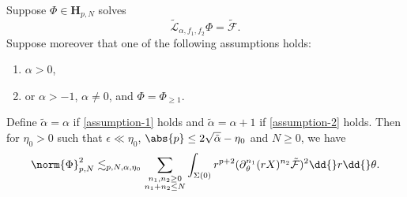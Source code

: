 \documentclass[10pt, reqno]{amsart}
\begin{document}
\begin{lemma}
Suppose \(\Phi{}\in \mathbf{H}_{p,N}\) solves
\begin{equation}\label{La-equation}
\tilde{\mathcal{L}}_{\alpha{},f_1,f_2}\Phi{} = \tilde{\mathcal{F}}.
\end{equation}
Suppose moreover that one of the following assumptions holds:
\begin{enumerate}
\item \label{assumption-1} \(\alpha{} > 0\),
\item \label{assumption-2} or \(\alpha{}>-1\), \(\alpha{}\neq{}0\), and \(\Phi{}=\Phi_{\ge 1}\).
\end{enumerate}
Define \(\tilde{\alpha{}} = \alpha{}\) if \cref{assumption-1} holds and
\(\tilde{\alpha{}} = \alpha{} + 1\) if \cref{assumption-2} holds. Then for \(\eta_0
> 0\) such that \(\epsilon{} \ll \eta_0\), \(\abs{p}\le 2\sqrt{\tilde{\alpha{}}}-\eta{}_0\)
and \(N\ge 0\), we have
\begin{equation}\label{elliptic-a-priori-equation}
\begin{split}
\norm{\Phi{}}_{p,N}^2\lesssim_{p,N,\alpha{},\eta{}_0} \sum_{\substack{n_1,n_2\ge 0\\n_1+n_2\le N}}\int _{\Sigma{}(0)} r^{p+2}(\partial{}_\theta^{n_1}(rX)^{n_2}\tilde{\mathcal{F}})^2\dd{}r\dd{}\theta{}.
\end{split}
\end{equation}
\label{elliptic-a-priori}
\end{lemma}
\end{document}
